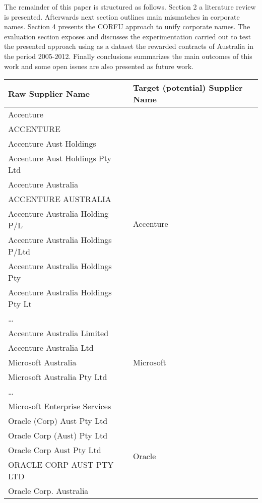 \documentclass{llncs}
\begin{document}
The remainder of this paper is structured as follows. Section 2 a literature review is presented. Afterwards next section outlines main mismatches in corporate names. Section 4 presents 
the CORFU approach to unify corporate names. The evaluation section exposes and discusses the experimentation carried out to test the presented approach using as a dataset the rewarded 
contracts of Australia in the period 2005-2012. Finally conclusions summarizes the main outcomes of this work 
and some open issues are also presented as future work.



\begin{table}[!htb]
\renewcommand{\arraystretch}{1.3}
\begin{center}
\begin{tabular}{|l|l|}
\hline
  \textbf{Raw Supplier Name} & \textbf{Target (potential) Supplier Name}\\  \hline
  Accenture & \multirow{12}{*}{Accenture} \\
  ACCENTURE & \\ 
  Accenture Aust Holdings & \\  
  Accenture Aust Holdings Pty Ltd & \\
  Accenture Australia & \\
  ACCENTURE AUSTRALIA & \\
  Accenture  Australia Holding P/L & \\
  Accenture Australia Holdings P/Ltd & \\
  Accenture Australia Holdings Pty & \\
  Accenture Australia Holdings Pty Lt  & \\
  \ldots  & \\
  Accenture Australia Limited & \\ \hline
  Accenture Australia Ltd & \multirow{3}{*}{Microsoft} \\
  Microsoft Australia & \\ 
  Microsoft Australia Pty Ltd & \\
  \ldots  & \\
  Microsoft Enterprise Services & \\ \hline
  Oracle (Corp) Aust Pty Ltd  & \multirow{14}{*}{Oracle} \\
  Oracle Corp (Aust) Pty Ltd  & \\
  Oracle Corp Aust Pty Ltd & \\
  ORACLE CORP AUST PTY LTD & \\
  Oracle Corp. Australia & \\

\end{tabular}
\end{center}
\end{table}
\end{document}

